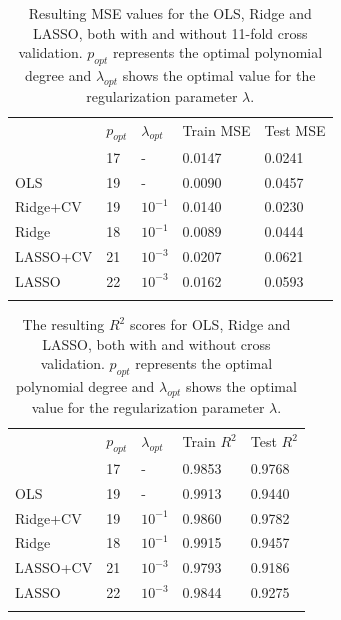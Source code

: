 \documentclass[numberedappendix, twocolappendix]{emulateapj}
\begin{document}
\begin{table}[!htb]
\begin{center}
\caption{Resulting MSE values for the OLS, Ridge and LASSO, both with and without 11-fold cross validation. $p_{opt}$ represents the optimal polynomial degree and $\lambda_{opt}$ shows the optimal value for the regularization parameter $\lambda$.}
\label{tab:MSE}  
\begin{tabular}{lllll}
\cline{2-5}\noalign{\smallskip}\cline{2-5}\noalign{\smallskip} 
& $p_{opt}$ & $\lambda_{opt}$ &  Train MSE & Test MSE \\ \noalign{\smallskip}\hline\noalign{\smallskip} \hline\noalign{\smallskip}
\multicolumn{1}{l|}{OLS+CV} & 17 & - & 0.0147 & 0.0241\\
\multicolumn{1}{l|}{OLS} & 19 & - & 0.0090 & 0.0457\\
\multicolumn{1}{l|}{Ridge+CV} & 19 & $10^{-1}$ & 0.0140 & 0.0230\\
\multicolumn{1}{l|}{Ridge} & 18 & $10^{-1}$ & 0.0089 & 0.0444\\
\multicolumn{1}{l|}{LASSO+CV} & 21 & $10^{-3}$ & 0.0207 & 0.0621 \\
\multicolumn{1}{l|}{LASSO} & 22 & $10^{-3}$ & 0.0162 & 0.0593\\
\noalign{\smallskip}\hline
\end{tabular}
\end{center}
\end{table}


\begin{table}[!htb]
\begin{center}
\caption{The resulting $R^2$ scores for OLS, Ridge and LASSO, both with and without cross validation. $p_{opt}$ represents the optimal polynomial degree and $\lambda_{opt}$ shows the optimal value for the regularization parameter $\lambda$.}
\label{tab:R2}  
\begin{tabular}{lllll}
\cline{2-5}\noalign{\smallskip}\cline{2-5}\noalign{\smallskip} 
& $p_{opt}$ & $\lambda_{opt}$ &  Train $R^2$ & Test $R^2$ \\ \noalign{\smallskip}\hline\noalign{\smallskip}
\hline\noalign{\smallskip}
\multicolumn{1}{l|}{OLS+CV} & 17 & - & 0.9853 & 0.9768\\
\multicolumn{1}{l|}{OLS} & 19 & - & 0.9913 & 0.9440\\
\multicolumn{1}{l|}{Ridge+CV} & 19 & $10^{-1}$ & 0.9860 & 0.9782\\
\multicolumn{1}{l|}{Ridge} & 18 & $10^{-1}$ & 0.9915 & 0.9457\\
\multicolumn{1}{l|}{LASSO+CV} & 21 & $10^{-3}$ & 0.9793 & 0.9186\\
\multicolumn{1}{l|}{LASSO} & 22 & $10^{-3}$ & 0.9844 & 0.9275\\
\noalign{\smallskip}\hline
\end{tabular}
\end{center}
\end{table}
\end{document}

